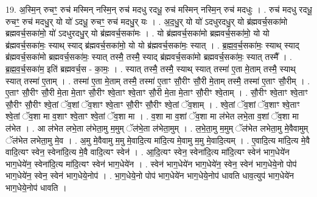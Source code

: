 \documentclass[17pt]{extarticle}
\begin{document}
19. अ॒स्मि॒न् रुचꣳ॒॒ रुच॑ मस्मिन् नस्मि॒न् रुच॑ मदधु रदधू॒ रुच॑ मस्मिन् नस्मि॒न् रुच॑ मदधुः । . रुच॑ मदधु रदधू॒ रुचꣳ॒॒ रुच॑ मदधु॒र् यो यो॑ ऽदधू॒ रुचꣳ॒॒ रुच॑ मदधु॒र् यः । . अ॒द॒धु॒र् यो यो॑ ऽदधुरदधु॒र् यो ब्र॑ह्मवर्च॒सका॑मो ब्रह्मवर्च॒सका॑मो॒ यो॑ ऽदधुरदधु॒र् यो ब्र॑ह्मवर्च॒सका॑मः । . यो ब्र॑ह्मवर्च॒सका॑मो ब्रह्मवर्च॒सका॑मो॒ यो यो ब्र॑ह्मवर्च॒सका॑मः॒ स्याथ् स्याद् ब्र॑ह्मवर्च॒सका॑मो॒ यो यो ब्र॑ह्मवर्च॒सका॑मः॒ स्यात् । . ब्र॒ह्म॒व॒र्च॒सका॑मः॒ स्याथ् स्याद् ब्र॑ह्मवर्च॒सका॑मो ब्रह्मवर्च॒सका॑मः॒ स्यात् तस्मै॒ तस्मै॒ स्याद् ब्र॑ह्मवर्च॒सका॑मो ब्रह्मवर्च॒सका॑मः॒ स्यात् तस्मै᳚ । . ब्र॒ह्म॒व॒र्च॒सका॑म॒ इति॑ ब्रह्मवर्च॒स - का॒मः॒ । . स्यात् तस्मै॒ तस्मै॒ स्याथ् स्यात् तस्मा॑ ए॒ता मे॒ताम् तस्मै॒ स्याथ् स्यात् तस्मा॑ ए॒ताम् । . तस्मा॑ ए॒ता मे॒ताम् तस्मै॒ तस्मा॑ ए॒ताꣳ सौ॒रीꣳ सौ॒री मे॒ताम् तस्मै॒ तस्मा॑ ए॒ताꣳ सौ॒रीम् । . ए॒ताꣳ सौ॒रीꣳ सौ॒री मे॒ता मे॒ताꣳ सौ॒रीꣳ श्वे॒ताꣳ श्वे॒ताꣳ सौ॒री मे॒ता मे॒ताꣳ सौ॒रीꣳ श्वे॒ताम् । . सौ॒रीꣳ श्वे॒ताꣳ श्वे॒ताꣳ सौ॒रीꣳ सौ॒रीꣳ श्वे॒तां ॅव॒शां ॅव॒शाꣳ श्वे॒ताꣳ सौ॒रीꣳ सौ॒रीꣳ श्वे॒तां ॅव॒शाम् । . श्वे॒तां ॅव॒शां ॅव॒शाꣳ श्वे॒ताꣳ श्वे॒तां ॅव॒शा मा व॒शाꣳ श्वे॒ताꣳ श्वे॒तां ॅव॒शा मा । . व॒शा मा व॒शां ॅव॒शा मा ल॑भेत लभे॒ता व॒शां ॅव॒शा मा ल॑भेत । . आ ल॑भेत लभे॒ता ल॑भेता॒मु म॒मुम् ॅल॑भे॒ता ल॑भेता॒मुम् । . ल॒भे॒ता॒मु म॒मुम् ॅल॑भेत लभेता॒मु मे॒वैवामुम् ॅल॑भेत लभेता॒मु मे॒व । . अ॒मु मे॒वैवामु म॒मु मे॒वादि॒त्य मा॑दि॒त्य मे॒वामु म॒मु मे॒वादि॒त्यम् । . ए॒वादि॒त्य मा॑दि॒त्य मे॒वै वादि॒त्यꣳ स्वेन॒ स्वेना॑दि॒त्य मे॒वै वादि॒त्यꣳ स्वेन॑ । . आ॒दि॒त्यꣳ स्वेन॒ स्वेना॑दि॒त्य मा॑दि॒त्यꣳ स्वेन॑ भाग॒धेये॑न भाग॒धेये॑न॒ स्वेना॑दि॒त्य मा॑दि॒त्यꣳ स्वेन॑ भाग॒धेये॑न । . स्वेन॑ भाग॒धेये॑न भाग॒धेये॑न॒ स्वेन॒ स्वेन॑ भाग॒धेये॒नो पोप॑ भाग॒धेये॑न॒ स्वेन॒ स्वेन॑ भाग॒धेये॒नोप॑ । . भा॒ग॒धेये॒नो पोप॑ भाग॒धेये॑न भाग॒धेये॒नोप॑ धावति धाव॒त्युप॑ भाग॒धेये॑न भाग॒धेये॒नोप॑ धावति । \newline
\end{document}
